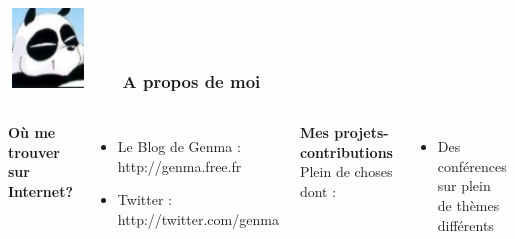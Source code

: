 \documentclass{beamer}
\begin{document}
\begin{frame}
\frametitle{\includegraphics[scale=0.4]{./images/Genma.jpg} \ \ \  A propos de moi  }
\begin{columns}[c] 
\textbf{Où me trouver sur Internet?}
\begin{itemize}
\item Le Blog de Genma : http://genma.free.fr
\item Twitter : http://twitter.com/genma
\end{itemize}
\textbf{Mes projets-contributions}
\\ Plein de choses dont :
\begin{itemize}
\item Des conférences sur plein de thèmes différents
\end{itemize}
\includegraphics[width=5cm,height=5cm]{./images/blog.png} 
\end{columns}
\end{frame}
\end{document}
